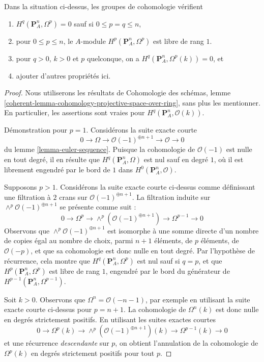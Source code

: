 \begin{lemma}
\label{lemma-twisted-hodge-cohomology-projective-space}
Dans la situation ci-dessus, les groupes de cohomologie vérifient
\begin{enumerate}
\item $H^q(\mathbf{P}^n_A, \Omega^p) = 0$
sauf si $0 \leq p = q \leq n$,
\item pour $0 \leq p \leq n$, le $A$-module
$H^p(\mathbf{P}^n_A, \Omega^p)$ est libre de rang $1$.
\item pour $q > 0$, $k > 0$ et $p$ quelconque, on a
$H^q(\mathbf{P}^n_A, \Omega^p(k)) = 0$, et
\item ajouter d'autres propriétés ici.
\end{enumerate}
\end{lemma}

\begin{proof}
Nous utiliserons les résultats de Cohomologie des schémas, lemme
\ref{coherent-lemma-cohomology-projective-space-over-ring},
sans plus les mentionner. En particulier, les assertions sont vraies
pour $H^q(\mathbf{P}^n_A, \mathcal{O}(k))$.

\medskip\noindent
Démonstration pour $p = 1$. Considérons la suite exacte courte
$$
0 \to \Omega \to \mathcal{O}(-1)^{\oplus n + 1} \to \mathcal{O} \to 0
$$
du lemme \ref{lemma-euler-sequence}. Puisque la cohomologie de $\mathcal{O}(-1)$
est nulle en tout degré, il en résulte que
$H^q(\mathbf{P}^n_A, \Omega)$ est nul sauf en degré $1$,
où il est librement engendré par le bord de $1$ dans
$H^0(\mathbf{P}^n_A, \mathcal{O})$.

\medskip\noindent
Supposons $p > 1$. Considérons la suite exacte courte
ci-dessus comme définissant une filtration à $2$ crans sur $\mathcal{O}(-1)^{\oplus n + 1}$.
La filtration induite sur $\wedge^p\mathcal{O}(-1)^{\oplus n + 1}$ se présente
comme suit :
$$
0 \to \Omega^p \to \wedge^p\left(\mathcal{O}(-1)^{\oplus n + 1}\right)
\to \Omega^{p - 1} \to 0
$$
Observons que $\wedge^p\mathcal{O}(-1)^{\oplus n + 1}$ est isomorphe
à une somme directe d'un nombre de copies égal au nombre de choix, parmi $n + 1$ éléments, de $p$ éléments, de $\mathcal{O}(-p)$,
et que sa cohomologie est donc nulle en tout degré.
Par l'hypothèse de récurrence, cela montre que $H^q(\mathbf{P}^n_A, \Omega^p)$
est nul sauf si $q = p$, et que $H^p(\mathbf{P}^n_A, \Omega^p)$ est libre
de rang $1$, engendré par le bord du générateur de
$H^{p - 1}(\mathbf{P}^n_A, \Omega^{p - 1})$.

\medskip\noindent
Soit $k > 0$. Observons que $\Omega^n = \mathcal{O}(-n - 1)$, par exemple
en utilisant la suite exacte courte ci-dessus pour $p = n + 1$.
La cohomologie de $\Omega^n(k)$ est donc nulle en degrés strictement positifs.
En utilisant les suites exactes courtes
$$
0 \to \Omega^p(k) \to \wedge^p\left(\mathcal{O}(-1)^{\oplus n + 1}\right)(k)
\to \Omega^{p - 1}(k) \to 0
$$
et une récurrence {\it descendante} sur $p$, on obtient l'annulation de la
cohomologie de $\Omega^p(k)$ en degrés strictement positifs pour tout $p$.
\end{proof}

